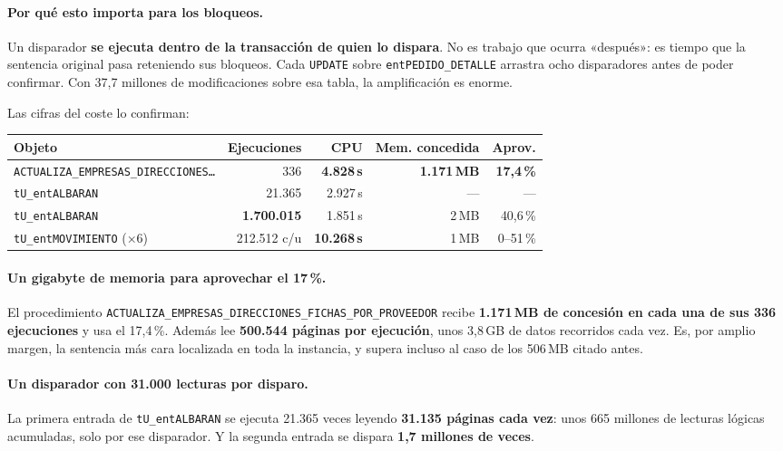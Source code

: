 \documentclass[11pt,a4paper]{article}
\newcommand{\cod}[1]{\texttt{\small #1}}
\newcommand{\critico}[1]{\textcolor{rojo}{\textbf{#1}}}
\begin{document}
\paragraph{Por qué esto importa para los bloqueos.} Un disparador
\textbf{se ejecuta dentro de la transacción de quien lo dispara}. No es
trabajo que ocurra «después»: es tiempo que la sentencia original pasa
reteniendo sus bloqueos. Cada \cod{UPDATE} sobre \cod{entPEDIDO\_DETALLE}
arrastra ocho disparadores antes de poder confirmar. Con 37,7 millones de
modificaciones sobre esa tabla, la amplificación es enorme.

Las cifras del coste lo confirman:

\begin{table}[h]
\centering
\small
\begin{tabular}{lrrrr}
\toprule
\textbf{Objeto} & \textbf{Ejecuciones} & \textbf{CPU} &
\textbf{Mem. concedida} & \textbf{Aprov.} \\
\midrule
\cod{ACTUALIZA\_EMPRESAS\_DIRECCIONES\ldots} & 336 & \critico{4.828\,s} &
  \critico{1.171\,MB} & \critico{17,4\,\%} \\
\cod{tU\_entALBARAN} & 21.365 & 2.927\,s & --- & --- \\
\cod{tU\_entALBARAN} & \critico{1.700.015} & 1.851\,s & 2\,MB & 40,6\,\% \\
\cod{tU\_entMOVIMIENTO} (×6) & 212.512 c/u & \critico{10.268\,s} & 1\,MB &
  0--51\,\% \\
\bottomrule
\end{tabular}
\end{table}

\paragraph{Un gigabyte de memoria para aprovechar el 17\,\%.} El
procedimiento \cod{ACTUALIZA\_EMPRESAS\_DIRECCIONES\_FICHAS\_POR\_PROVEEDOR}
recibe \textbf{1.171\,MB de concesión en cada una de sus 336 ejecuciones} y
usa el 17,4\,\%. Además lee \textbf{500.544 páginas por ejecución}, unos
3,8\,GB de datos recorridos cada vez. Es, por amplio margen, la sentencia
más cara localizada en toda la instancia, y supera incluso al caso de los
506\,MB citado antes.

\paragraph{Un disparador con 31.000 lecturas por disparo.} La primera entrada
de \cod{tU\_entALBARAN} se ejecuta 21.365 veces leyendo \textbf{31.135 páginas
cada vez}: unos 665 millones de lecturas lógicas acumuladas, solo por ese
disparador. Y la segunda entrada se dispara \textbf{1,7 millones de veces}.
\end{document}
